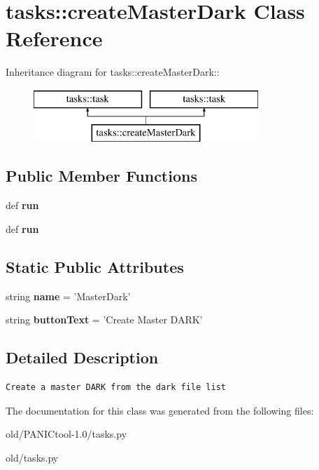 \section{tasks::create\-Master\-Dark Class Reference}
\label{classtasks_1_1createMasterDark}
Inheritance diagram for tasks::create\-Master\-Dark::\begin{figure}[H]
\begin{center}
\leavevmode
\includegraphics[height=2cm]{classtasks_1_1createMasterDark}
\end{center}
\end{figure}
\subsection*{Public Member Functions}
\begin{CompactItemize}
\item 
def \textbf{run}\label{classtasks_1_1createMasterDark_aaf59474fc1f553ecd05830b091eff02}

\item 
def \textbf{run}\label{classtasks_1_1createMasterDark_aaf59474fc1f553ecd05830b091eff02}

\end{CompactItemize}
\subsection*{Static Public Attributes}
\begin{CompactItemize}
\item 
string \textbf{name} = '{\bfcreate\-Master\-Dark}'\label{classtasks_1_1createMasterDark_6ae819dc4dc8afd8141b2fa2e298f639}

\item 
string \textbf{button\-Text} = 'Create Master DARK'\label{classtasks_1_1createMasterDark_673ea894f4c4df18ca8f7743a02d93fc}

\end{CompactItemize}


\subsection{Detailed Description}


\footnotesize\begin{verbatim}Create a master DARK from the dark file list
\end{verbatim}
\normalsize
 



The documentation for this class was generated from the following files:\begin{CompactItemize}
\item 
old/PANICtool-1.0/tasks.py\item 
old/tasks.py\end{CompactItemize}
